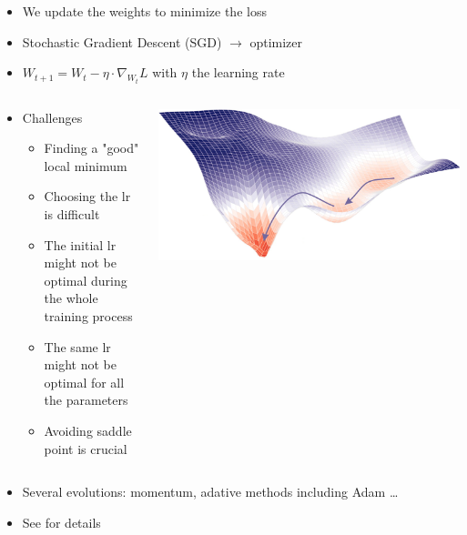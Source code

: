 \documentclass[usenames,dvipsnames]{beamer}
\begin{document}
	\begin{frame}{\secname}{\subsecname}
		\begin{itemize}
			\item We update the weights to minimize the loss
			\item Stochastic Gradient Descent (\alert{SGD}) $\rightarrow$ \alert{optimizer}
			\item $W_{t+1} = W_t - \eta \cdot \nabla_{W_t}L$ with $\eta$ the \alert{learning rate}
		\end{itemize}
		\begin{columns}
			\begin{column}{0.7\textwidth}
				\begin{itemize}
					\item Challenges
					\begin{itemize} 
					    \item Finding a "good" local minimum
					    \item Choosing the lr is difficult
					    \item The initial lr might not be optimal during the whole training process
					    \item The same lr might not be optimal for all the parameters
					    \item Avoiding saddle point is crucial
					\end{itemize}
				\end{itemize}
			\end{column}
			\begin{column}{0.3\textwidth}
				\begin{center}
					\includegraphics[width=\linewidth]{figures/DL_fundamentals/gradient_descent.png}
				\end{center}
			\end{column}
		\end{columns}
		\begin{itemize}
		    \item Several evolutions: momentum, adative methods including \alert{Adam} \dots
			\item See \cite{Ruder2016} for details 
		\end{itemize}
	\end{frame}   
\end{document}
